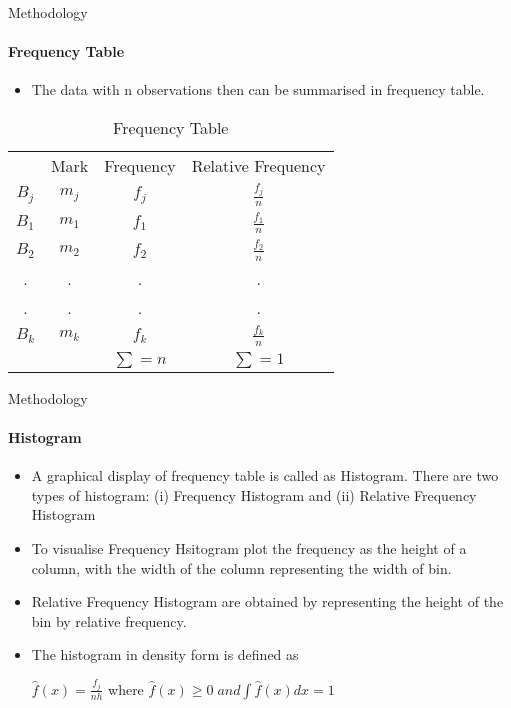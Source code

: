 \documentclass{beamer}
\begin{document}
\begin{frame}{Methodology}
\framesubtitle{Frequency Table}
\begin{itemize}
		\item The data with n observations then can be summarised in frequency table.
\end{itemize}
\vspace{-8mm}
\begin{table}[ht]
	\caption{Frequency Table} %
	\centering %
	\begin{tabular}{c c c c} %
		\hline\hline %
		 & Mark  & Frequency & Relative Frequency  \\ [0.5ex] %
		$B_j$ & $m_j$ & $f_j$ & $\frac{f_j}{n}$\\ [0.5ex] %
		\hline %
		$B_1$ & $m_1$ & $f_1$  & $\frac{f_1}{n}$\\
		$B_2$ & $m_2$ & $f_2$  & $\frac{f_2}{n}$\\
		. & .  & .   & .   \\
		. & .  & .   & .   \\
		$B_k$ & $m_k$ & $f_k$  & $\frac{f_k}{n}$\\
		\hline %
	          & & $ \sum = n $& $\sum = 1$\\
	\end{tabular}
	\label{table:nonlin} %
\end{table}

\end{frame}


\begin{frame}{Methodology}
\framesubtitle{Histogram}
\begin{itemize}
	
\item A graphical display of frequency table is called as Histogram. There are two types of histogram: (i) Frequency Histogram and (ii) Relative Frequency Histogram

\item To visualise Frequency Hsitogram  plot the frequency as the height of a column, with the width of the column representing the width of bin. 

\item Relative Frequency Histogram are obtained by representing the height of the bin by relative frequency.

\item The histogram in density form is defined as 

{\center $\hat f(x) = \frac{f_j}{nh} $ where $\hat f(x) \geq 0 \; and \int \hat f(x) dx =1 $\\}
	
\end{itemize}

\end{frame}
\end{document}
